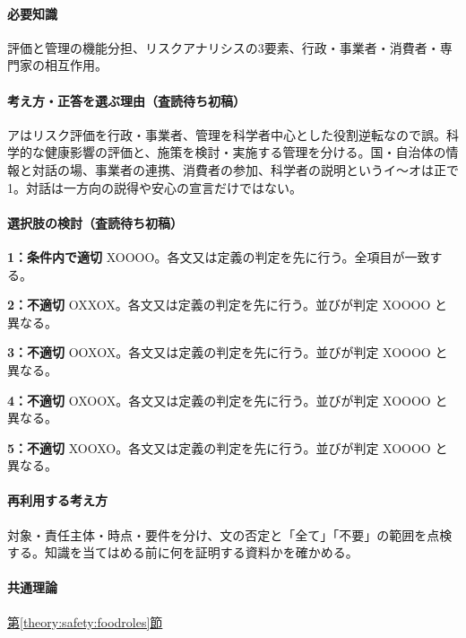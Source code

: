 \paragraph{必要知識} 評価と管理の機能分担、リスクアナリシスの3要素、行政・事業者・消費者・専門家の相互作用。

\paragraph{考え方・正答を選ぶ理由（査読待ち初稿）} アはリスク評価を行政・事業者、管理を科学者中心とした役割逆転なので誤。科学的な健康影響の評価と、施策を検討・実施する管理を分ける。国・自治体の情報と対話の場、事業者の連携、消費者の参加、科学者の説明というイ〜オは正で1。対話は一方向の説得や安心の宣言だけではない。

\paragraph{選択肢の検討（査読待ち初稿）}\mbox{}\par

\noindent\textbf{1：条件内で適切} XOOOO。各文又は定義の判定を先に行う。全項目が一致する。\par

\noindent\textbf{2：不適切} OXXOX。各文又は定義の判定を先に行う。並びが判定 XOOOO と異なる。\par

\noindent\textbf{3：不適切} OOXOX。各文又は定義の判定を先に行う。並びが判定 XOOOO と異なる。\par

\noindent\textbf{4：不適切} OXOOX。各文又は定義の判定を先に行う。並びが判定 XOOOO と異なる。\par

\noindent\textbf{5：不適切} XOOXO。各文又は定義の判定を先に行う。並びが判定 XOOOO と異なる。\par

\paragraph{再利用する考え方} 対象・責任主体・時点・要件を分け、文の否定と「全て」「不要」の範囲を点検する。知識を当てはめる前に何を証明する資料かを確かめる。

\paragraph{共通理論} \hyperref[theory:safety:foodroles]{第\ref*{theory:safety:foodroles}節}

